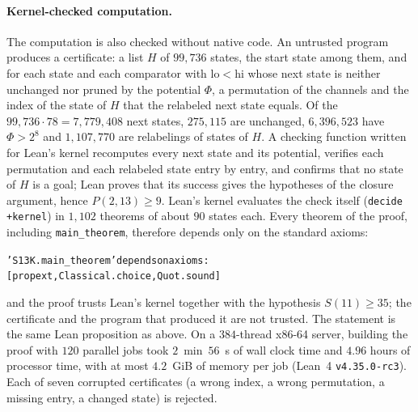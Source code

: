 
\paragraph{Kernel-checked computation.}
The computation is also checked without native code. An untrusted program produces a certificate: a
list $H$ of $99{,}736$ states, the start state among them, and for each state and each comparator with
$\mathrm{lo}<\mathrm{hi}$ whose next state is neither unchanged nor pruned by the potential $\Phi$, a
permutation of the channels and the index of the state of $H$ that the relabeled next state equals.
Of the $99{,}736\cdot78=7{,}779{,}408$ next states, $275{,}115$ are unchanged, $6{,}396{,}523$ have
$\Phi>2^8$ and $1{,}107{,}770$ are relabelings of states of $H$. A checking function written for Lean's
kernel recomputes every next state and its potential, verifies each permutation and each relabeled
state entry by entry, and confirms that no state of $H$ is a goal; Lean proves that its success gives
the hypotheses of the closure argument, hence $P(2,13)\ge9$. Lean's kernel evaluates the check itself
(\texttt{decide +kernel}) in $1{,}102$ theorems of about $90$ states each. Every theorem of the proof,
including \texttt{main\_theorem}, therefore depends only on the standard axioms:
\begin{alltt}\small
'S13K.main_theorem' depends on axioms: [propext, Classical.choice, Quot.sound]
\end{alltt}
and the proof trusts Lean's kernel together with the hypothesis $S(11)\ge35$; the certificate and the
program that produced it are not trusted. The statement is the same Lean proposition as above. On a
$384$-thread x86-64 server, building the proof with $120$ parallel jobs took $2$~min~$56$~s of wall
clock time and $4.96$ hours of processor time, with at most $4.2$~GiB of memory per job (Lean~4
\texttt{v4.35.0-rc3}). Each of seven corrupted certificates (a wrong index, a wrong permutation, a missing
entry, a changed state) is rejected.
